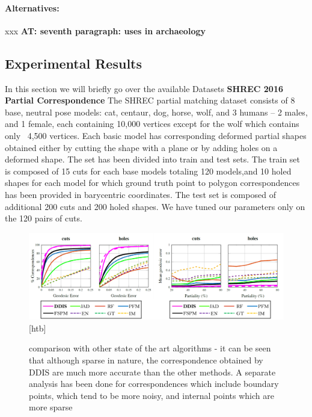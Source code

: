 \documentclass[10pt,twocolumn,letterpaper]{article}
\newcommand{\colornote}[3]{{\color{#1}\bf{#2: #3}\normalfont}}
\newcommand{\colornote}[3]{}
\newcommand {\ayellet}[1]{\colornote{blue}{AT}{#1}}
\begin{document}
\paragraph{Alternatives:} xxx
\ayellet{seventh paragraph: uses in archaeology}

\subsection{Experimental Results}
In this section we will briefly go over the available Datasets
\textbf{SHREC 2016 Partial Correspondence}  
The SHREC partial matching dataset\cite{cosmo2016shrec} consists of 8 base, neutral pose models: cat, centaur, dog, horse, wolf, and 3 humans – 2 males, and 1 female, each containing 10,000 vertices except for the wolf which contains only ~4,500 vertices. Each basic model has corresponding deformed partial shapes obtained either by cutting the shape with a plane or by adding holes on a deformed shape. The set has been divided into train and test sets. The train set is composed of 15 cuts for each base models totaling 120 models,and 10 holed shapes for each model for which ground truth point to polygon correspondences has been provided in barycentric coordinates. The test set is composed of additional 200 cuts and 200 holed shapes. We have tuned our parameters only on the 120 pairs of cuts.

\begin{figure}[htb]
	\centering

	\includegraphics[width=1\textwidth]{figures/ROCSHREC16.png}[htb]
	\caption{comparison with other state of the art algorithms - it can be seen that although sparse in nature, the correspondence obtained by DDIS are much more accurate than the other methods. 
		A separate analysis has been done for correspondences which include boundary points, which tend to be more noisy, and internal points which are more sparse}
\end{figure}
\end{document}
